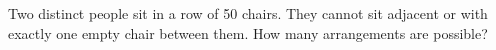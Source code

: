 Two distinct people sit in a row of 50 chairs. They cannot sit adjacent or with exactly one empty chair between them. How many arrangements are possible?
